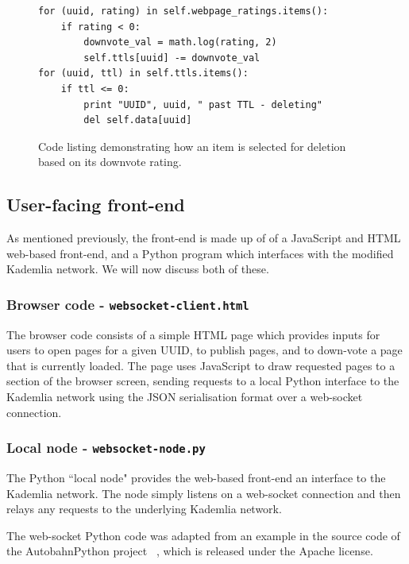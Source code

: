 \begin{figure}[H]
	\begin{lstlisting}
for (uuid, rating) in self.webpage_ratings.items():
	if rating < 0:
	    downvote_val = math.log(rating, 2)
	    self.ttls[uuid] -= downvote_val
for (uuid, ttl) in self.ttls.items():
    if ttl <= 0:
        print "UUID", uuid, " past TTL - deleting"
        del self.data[uuid]
	\end{lstlisting}
    \caption{Code listing demonstrating how an item is selected for deletion based on its downvote rating.}
    \label{fig:code-downvote}
\end{figure}

\subsection{User-facing front-end}

As mentioned previously, the front-end is made up of of a JavaScript and HTML web-based front-end, and a Python program which
interfaces with the modified Kademlia network. We will now discuss both of these.

\subsubsection{Browser code - \texttt{websocket-client.html}}

The browser code consists of a simple HTML page which provides inputs for users to open pages for a given UUID, to publish pages,
and to down-vote a page that is currently loaded. The page uses JavaScript to draw requested pages to a section of the browser screen,
sending requests to a local Python interface to the Kademlia network using the JSON serialisation format over a web-socket connection.

\subsubsection{Local node - \texttt{websocket-node.py}}

The Python ``local node" provides the web-based front-end an interface to the Kademlia network. The node simply listens on a web-socket connection
and then relays any requests to the underlying Kademlia network.

The web-socket Python code was adapted from an example in the source code of the AutobahnPython project ~\cite{websocket}, which is released
under the Apache license.

